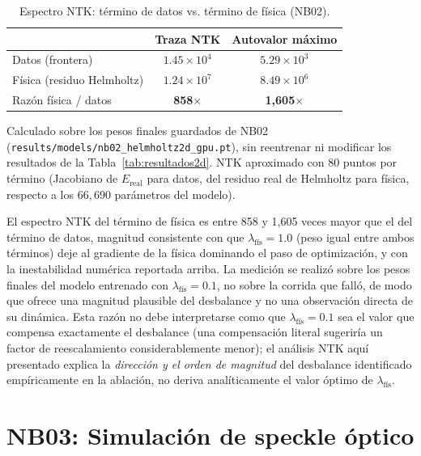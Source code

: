 \begin{table}[htbp]
\centering
\begin{threeparttable}
\caption{Espectro NTK: término de datos vs. término de física (NB02).}
\label{tab:ntk}
\begin{tabular}{lcc}
\toprule
 & Traza NTK & Autovalor máximo \\
\midrule
Datos (frontera)            & $1.45 \times 10^{4}$ & $5.29 \times 10^{3}$ \\
Física (residuo Helmholtz)  & $1.24 \times 10^{7}$ & $8.49 \times 10^{6}$ \\
\midrule
Razón física / datos        & \textbf{858$\times$} & \textbf{1{,}605$\times$} \\
\bottomrule
\end{tabular}
\begin{tablenotes}\small
    \item Calculado sobre los pesos finales guardados de NB02
    (\texttt{results/models/nb02\_helmholtz2d\_gpu.pt}), sin reentrenar ni
    modificar los resultados de la Tabla~\ref{tab:resultados2d}. NTK
    aproximado con 80 puntos por término (Jacobiano de $E_\text{real}$ para
    datos, del residuo real de Helmholtz para física, respecto a los
    $66{,}690$ parámetros del modelo).
\end{tablenotes}
\end{threeparttable}
\end{table}

El espectro NTK del término de física es entre 858 y 1{,}605 veces mayor que
el del término de datos, magnitud consistente con que
$\lambda_\text{fís} = 1.0$ (peso igual entre ambos términos) deje al gradiente
de la física dominando el paso de optimización, y con la inestabilidad
numérica reportada arriba. La medición se realizó sobre los pesos finales del
modelo entrenado con $\lambda_\text{fís} = 0.1$, no sobre la corrida que falló,
de modo que ofrece una magnitud plausible del desbalance y no una observación
directa de su dinámica. Esta razón no
debe interpretarse como que $\lambda_\text{fís} = 0.1$ sea el valor que
compensa exactamente el desbalance (una compensación literal sugeriría un
factor de reescalamiento considerablemente menor); el análisis NTK aquí
presentado explica la \textit{dirección y el orden de magnitud} del
desbalance identificado empíricamente en la ablación, no deriva
analíticamente el valor óptimo de $\lambda_\text{fís}$.

\section{NB03: Simulación de speckle óptico}
\label{sec:resultados_speckle}


